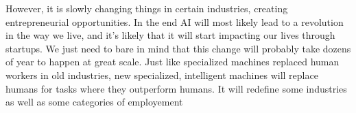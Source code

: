 \documentclass[12pt]{article}
\begin{document}
 However, it is slowly changing things in certain industries, creating
 entrepreneurial opportunities. In the end AI will most likely lead to a
 revolution in the  way we live, and it's likely that it will start impacting
 our lives through  startups. We just need to bare in mind that this change will
 probably take dozens  of year to happen at great scale. Just like specialized
 machines replaced human workers in old industries,  new specialized,
 intelligent machines will replace humans for tasks where they outperform
 humans. It will redefine some industries as well as some categories of employement

\pagebreak

\printglossaries
\pagebreak


\end{document}
